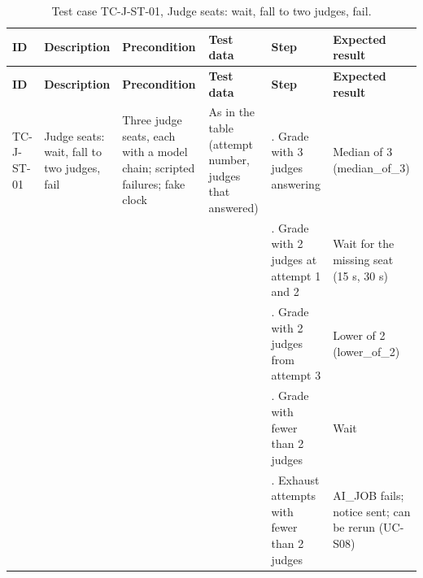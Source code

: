 {\footnotesize{}\renewcommand{\arraystretch}{1.1}
\begin{longtable}{|>{\raggedright\arraybackslash}p{}|>{\raggedright\arraybackslash}p{}|>{\raggedright\arraybackslash}p{}|>{\raggedright\arraybackslash}p{}|>{\raggedright\arraybackslash}p{}|>{\raggedright\arraybackslash}p{}|}
\caption{Test case TC-J-ST-01, Judge seats: wait, fall to two judges, fail.} \\
\hline
\textbf{ID} & \textbf{Description} & \textbf{Precondition} & \textbf{Test data} & \textbf{Step} & \textbf{Expected result} \\ \hline
\endfirsthead
\hline
\textbf{ID} & \textbf{Description} & \textbf{Precondition} & \textbf{Test data} & \textbf{Step} & \textbf{Expected result} \\ \hline
\endhead
TC-J-ST-01 & Judge seats: wait, fall to two judges, fail & Three judge seats, each with a model chain; scripted failures; fake clock & As in the table (attempt number, judges that answered) & 1. Grade with 3 judges answering & Median of 3 (median\_\allowbreak{}of\_\allowbreak{}3) \\ \cline{5-6}
 &  &  &  & 2. Grade with 2 judges at attempt 1 and 2 & Wait for the missing seat (15 s, 30 s) \\ \cline{5-6}
 &  &  &  & 3. Grade with 2 judges from attempt 3 & Lower of 2 (lower\_\allowbreak{}of\_\allowbreak{}2) \\ \cline{5-6}
 &  &  &  & 4. Grade with fewer than 2 judges & Wait \\ \cline{5-6}
 &  &  &  & 5. Exhaust attempts with fewer than 2 judges & AI\_JOB fails; notice sent; can be rerun (UC-S08) \\ \hline
\end{longtable}
}

